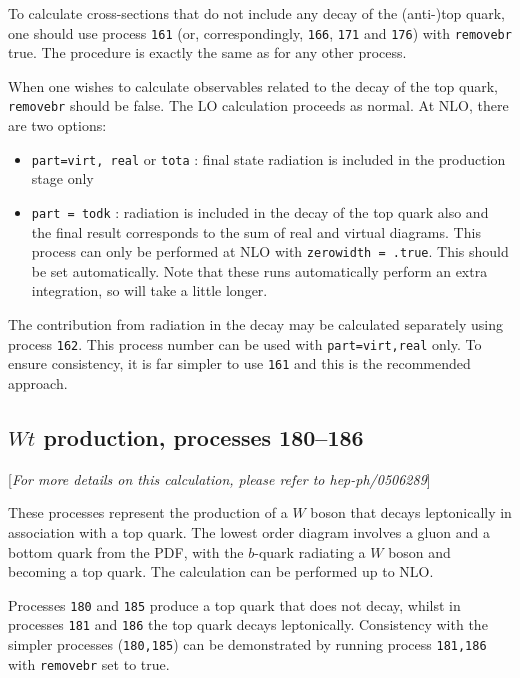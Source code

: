 \documentclass[12pt]{article}
\begin{document}
To calculate cross-sections that do not include any decay of the (anti-)top
quark, one should use process {\tt 161}
(or, correspondingly, {\tt 166}, {\tt 171} and {\tt 176}) with {\tt removebr}
true. The procedure is exactly the same
as for any other process.

When one wishes to calculate observables related to the decay of the top
quark, {\tt removebr} should be false.
The LO calculation proceeds as normal. At NLO, there are two options:
\begin{itemize}
\item {\tt part=virt, real} or {\tt tota} : final state radiation is included
in the production stage only
\item {\tt part = todk} : radiation is included in the decay of the top
quark also and the final result corresponds to the sum of real and virtual
diagrams. This process can only be performed at NLO with 
{\tt zerowidth = .true}. This should be set automatically.
Note that these runs automatically perform an extra integration, so
will take a little longer.
\end{itemize}

The contribution from radiation in the decay may be calculated separately using
process {\tt 162}. This process number can be used with {\tt part=virt,real}
only. To ensure consistency, it is far simpler to use {\tt 161}
and this is the recommended approach.

\subsection{$Wt$ production, processes 180--186}
\label{subsec:wt}

\begin{center}
[{\it For more details on this calculation, please refer to hep-ph/0506289}]
\end{center}

These processes represent the production of a $W$ boson that decays leptonically
in association with a top quark. The lowest order diagram involves a gluon and
a bottom quark from the PDF, with the $b$-quark radiating a $W$ boson and
becoming a top quark. The calculation can be performed up to NLO.

Processes {\tt 180} and {\tt 185} produce a top quark that does not decay,
whilst in processes {\tt 181} and {\tt 186} the top quark decays leptonically.
Consistency with
the simpler processes ({\tt 180,185}) can be demonstrated by running process
{\tt 181,186} with {\tt removebr} set to true.
\end{document}
